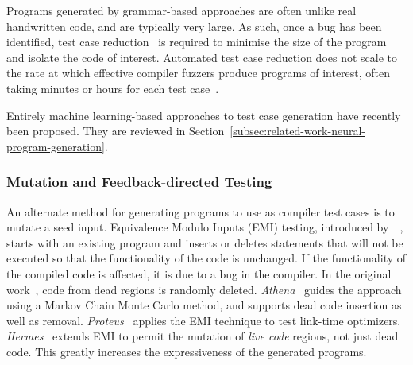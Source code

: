 
Programs generated by grammar-based approaches are often unlike real handwritten code, and are typically very large. As such, once a bug has been identified, test case reduction~\cite{Regehr2012a} is required to minimise the size of the program and isolate the code of interest. Automated test case reduction does not scale to the rate at which effective compiler fuzzers produce programs of interest, often taking minutes or hours for each test case~\cite{Pflanzer2016}.

Entirely machine learning-based approaches to test case generation have recently been proposed. They are reviewed in Section~\ref{subsec:related-work-neural-program-generation}.


\subsubsection{Mutation and Feedback-directed Testing}

An alternate method for generating programs to use as compiler test cases is to mutate a seed input.
Equivalence Modulo Inputs (EMI) testing, introduced by~\citeauthor{Le2013a}~\cite{Le2013a}, starts with an existing program and inserts or deletes statements that will not be executed so that the functionality of the code is unchanged. If the functionality of the compiled code is affected, it is due to a bug in the compiler. In the original work~\cite{Le2013a}, code from dead regions is randomly deleted.
\emph{Athena}~\cite{Le2015} guides the approach using a Markov Chain Monte Carlo method, and supports dead code insertion as well as removal.
\emph{Proteus}~\cite{Le2015a} applies the EMI technique to test link-time optimizers.
\emph{Hermes}~\cite{Sun2016a} extends EMI to permit the mutation of \emph{live code} regions, not just dead code. This greatly increases the expressiveness of the generated programs.

